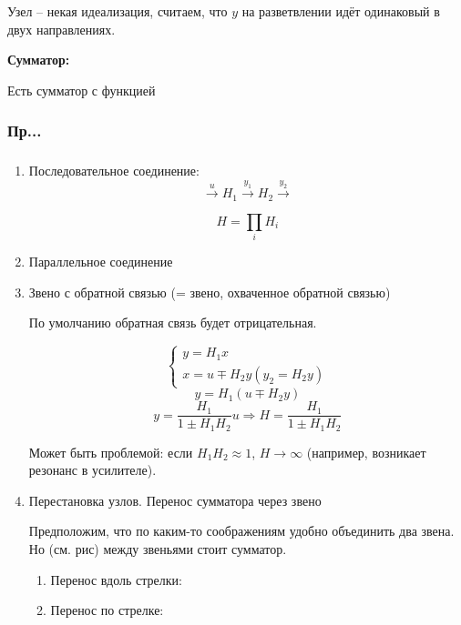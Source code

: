 \documentclass[main.tex]{subfiles}
\begin{document}
Узел -- некая идеализация, считаем, что $ y $ на разветвлении идёт одинаковый в двух направлениях.

\textbf{Сумматор:} %

Есть сумматор с функцией

\subsubsection{Пр...} %


\subsubsection{}

\begin{enumerate}[noitemsep]
    \item Последовательное соединение:
    $$ \xrightarrow{u}\boxed{H_1}\xrightarrow{y_1}\boxed{H_2}\xrightarrow{y_2} $$

    $$ \boxed{H = \prod_i H_i } $$
    \item Параллельное соединение

    \item Звено с обратной связью (= звено, охваченное обратной связью)

    По умолчанию обратная связь будет отрицательная.


    $$ \begin{cases}
        y = H_1x \\
        x = u \mp H_2 y (y_2 = H_2y)
    \end{cases} $$
    $$ y = H_1 (u \mp H_2 y) $$
    $$ y = \frac{H_1}{1 \pm H_1 H_2}u \Rightarrow H = \frac{H_1}{1 \pm H_1 H _2} $$

    Может быть проблемой: если $ H_1 H_2 \approx 1 $, $ H \to \infty $ (например, возникает резонанс в усилителе).

    \item Перестановка узлов. Перенос сумматора через звено

    Предположим, что по каким-то соображениям удобно объединить два звена.
    Но (см. рис) между звеньями стоит сумматор.

    \begin{enumerate}[noitemsep]
        \item Перенос вдоль стрелки:
        \item Перенос по стрелке:
    \end{enumerate}


\end{enumerate}
\end{document}
